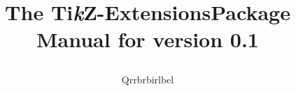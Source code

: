 %
%
%
\newcommand*\tikzextname{Ti\textit kZ-Extensions}
\newcommand*\tikzextversion{0.1}


\title{\bfseries The \tikzextname\space Package\\
  \large Manual for version \tikzextversion\\[1mm]
\author{Qrrbrbirlbel}}

\maketitle
\label{table-of-contents}

\tableofcontents







\printindex


